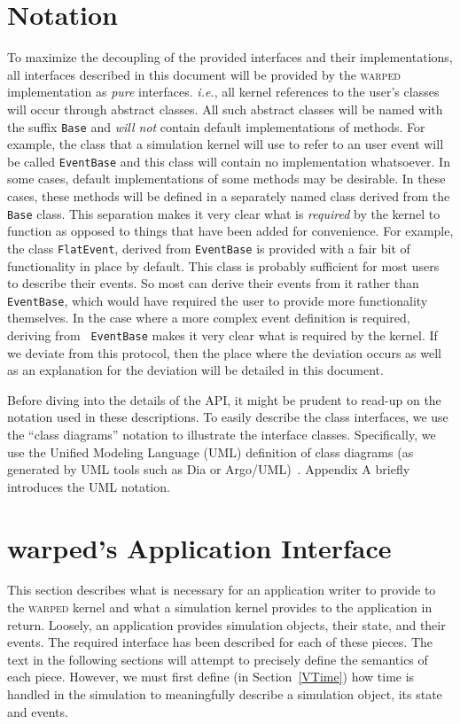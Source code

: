 \documentclass[11pt]{article}
\begin{document}
\section{Notation}

To maximize the decoupling of the provided interfaces and their
implementations, all interfaces described in this document will be
provided by the \textsc{warped} implementation as \emph{pure} interfaces.
\emph{i.e.}, all kernel references to the user's classes will occur through
abstract classes.  All such abstract classes will be named with the suffix
{\tt Base} and \emph{will not} contain default implementations of methods.
For example, the class that a simulation kernel will use to refer to an
user event will be called {\tt EventBase} and this class will contain no
implementation whatsoever.  In some cases, default implementations of some
methods may be desirable.  In these cases, these methods will be defined
in a separately named class derived from the {\tt Base} class.  This
separation makes it very clear what is \emph{required} by the kernel to
function as opposed to things that have been added for convenience.  For
example, the class {\tt FlatEvent}, derived from {\tt EventBase} is
provided with a fair bit of functionality in place by default.  This class
is probably sufficient for most users to describe their events. So most
can derive their events from it rather than {\tt EventBase}, which would
have required the user to provide more functionality themselves.  In the
case where a more complex event definition is required, deriving from {\tt
EventBase} makes it very clear what is required by the kernel.  If we
deviate from this protocol, then the place where the deviation occurs as
well as an explanation for the deviation will be detailed in this
document.

Before diving into the details of the API, it might be prudent to read-up
on the notation used in these descriptions. To easily describe the class
interfaces, we use the ``class diagrams'' notation to illustrate the
interface classes. Specifically, we use the Unified Modeling Language (UML)
definition of class diagrams (as generated by UML tools such as Dia or
Argo/UML)~\cite{fowler-97}. Appendix A briefly introduces the UML notation.

\section{{\sc warped}'s Application Interface}

This section describes what is necessary for an application writer to
provide to the \textsc{warped} kernel and what a simulation kernel
provides to the application in return.  Loosely, an application provides
simulation objects, their state, and their events.  The required interface
has been described for each of these pieces.  The text in the following
sections will attempt to precisely define the semantics of each
piece. However, we must first define (in Section~\ref{VTime}) how time is
handled in the simulation to meaningfully describe a simulation object,
its state and events.
\end{document}
